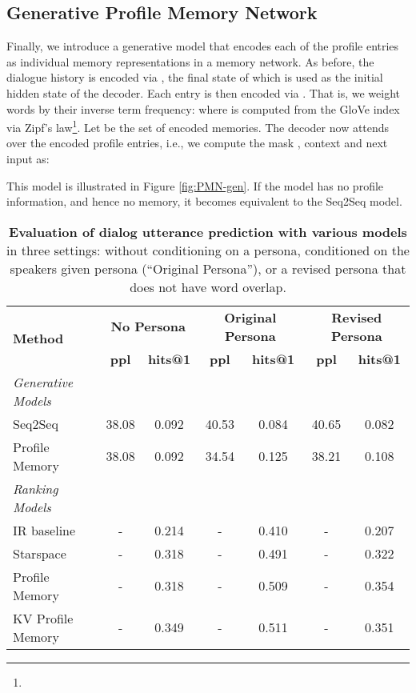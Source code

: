 \documentclass[11pt,a4paper]{article}
\begin{document}
\subsection{Generative Profile Memory Network}

Finally, we introduce a generative model that encodes each of the profile entries as individual memory representations in a memory network. As before, the dialogue history is encoded via , the final state of which is used as the initial hidden state of the decoder. Each entry  is then encoded via . That is, we weight words by their inverse term frequency:  where  is computed from the GloVe index via Zipf's law\footnote{}. Let  be the set of encoded memories. The decoder now attends over the encoded profile entries, i.e., we compute the mask , context  and next input  as:

\ifarxiv
This model is illustrated in Figure \ref{fig:PMN-gen}.
\fi
If the model has no profile information, and hence no memory, it becomes equivalent to the Seq2Seq model.
 \begin{table*}[t]
  \centering
  \begin{tabular}{lcccccc}
  \toprule
  \multirow{2}{*}{\textbf{Method}} & \multicolumn{2}{c}{\textbf{No Persona}} & \multicolumn{2}{c}{\textbf{Original Persona}} & \multicolumn{2}{c}{\textbf{Revised Persona}}\\
   & \textbf{ppl} & \textbf{hits@1} & \textbf{ppl} & \textbf{hits@1}  &\textbf{ppl} & \textbf{hits@1} 
   \\
  \midrule
  {\em Generative Models} \\
  Seq2Seq        & 38.08 & 0.092 & 40.53 & 0.084 &  40.65 & 0.082 \\
  Profile Memory & 38.08 & 0.092 & 34.54 & 0.125 & 38.21 & 0.108 \\
  \midrule
  {\em Ranking Models} \\
    IR baseline        & - & 0.214 &  - & 0.410  & - &  0.207  \\
  Starspace          & - & 0.318 &   - & 0.491  & - & 0.322   \\
 Profile Memory    & - & 0.318  &  - & 0.509  &  - & 0.354  \\
 KV Profile Memory & - & 0.349  &  - & 0.511  &  - & 0.351   \\
\bottomrule
  \end{tabular}
  \caption{{\bf Evaluation of dialog utterance prediction with various models} in three settings: without conditioning on a persona, conditioned on the speakers given persona (``Original Persona''),  or a revised persona that does not have word overlap.      \label{tab:all-results}
     }
\end{table*}
\end{document}
